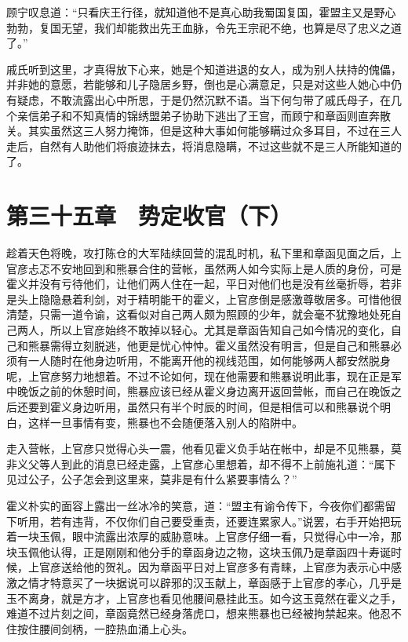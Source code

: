 顾宁叹息道：“只看庆王行径，就知道他不是真心助我蜀国复国，霍盟主又是野心勃勃，复国无望，我们却能救出先王血脉，令先王宗祀不绝，也算是尽了忠义之道了。”

戚氏听到这里，才真得放下心来，她是个知道进退的女人，成为别人扶持的傀儡，并非她的意愿，若能够和儿子隐居乡野，倒也是心满意足，只是对这些人她心中仍有疑虑，不敢流露出心中所思，于是仍然沉默不语。当下何匀带了戚氏母子，在几个亲信弟子和不知真情的锦绣盟弟子协助下逃出了王宫，而顾宁和章函则直奔散关。其实虽然这三人努力掩饰，但是这种大事如何能够瞒过众多耳目，不过在三人走后，自然有人助他们将痕迹抹去，将消息隐瞒，不过这些就不是三人所能知道的了。

\chapter{第三十五章　势定收官（下）}

趁着天色将晚，攻打陈仓的大军陆续回营的混乱时机，私下里和章函见面之后，上官彦忐忑不安地回到和熊暴合住的营帐，虽然两人如今实际上是人质的身份，可是霍义并没有亏待他们，让他们两人住在一起，平日对他们也是没有丝毫折辱，若非是头上隐隐悬着利剑，对于精明能干的霍义，上官彦倒是感激尊敬居多。可惜他很清楚，只需一道令谕，这看似对自己两人颇为照顾的少年，就会毫不犹豫地处死自己两人，所以上官彦始终不敢掉以轻心。尤其是章函告知自己如今情况的变化，自己和熊暴需得立刻脱逃，他更是忧心忡忡。霍义虽然没有明言，但是自己和熊暴必须有一人随时在他身边听用，不能离开他的视线范围，如何能够两人都安然脱身呢，上官彦努力地想着。不过不论如何，现在他需要和熊暴说明此事，现在正是军中晚饭之前的休憩时间，熊暴应该已经从霍义身边离开返回营帐，而自己在晚饭之后还要到霍义身边听用，虽然只有半个时辰的时间，但是相信可以和熊暴说个明白，这样一旦事情有变，熊暴也不会随便落入别人的陷阱中。

走入营帐，上官彦只觉得心头一震，他看见霍义负手站在帐中，却是不见熊暴，莫非义父等人到此的消息已经走露，上官彦心里想着，却不得不上前施礼道：“属下见过公子，公子怎会到这里来，莫非是有什么紧要事情么？”

霍义朴实的面容上露出一丝冰冷的笑意，道：“盟主有谕令传下，今夜你们都需留下听用，若有违背，不仅你们自己要受重责，还要连累家人。”说罢，右手开始把玩着一块玉佩，眼中流露出浓厚的威胁意味。上官彦仔细一看，只觉得心中一冷，那块玉佩他认得，正是刚刚和他分手的章函身边之物，这块玉佩乃是章函四十寿诞时候，上官彦送给他的贺礼。因为章函平日对上官彦多有青睐，上官彦为表示心中感激之情才特意买了一块据说可以辟邪的汉玉献上，章函感于上官彦的孝心，几乎是玉不离身，就是方才，上官彦也看见他腰间悬挂此玉。如今这玉竟然在霍义之手，难道不过片刻之间，章函竟然已经身落虎口，想来熊暴也已经被拘禁起来。他忍不住按住腰间剑柄，一腔热血涌上心头。


